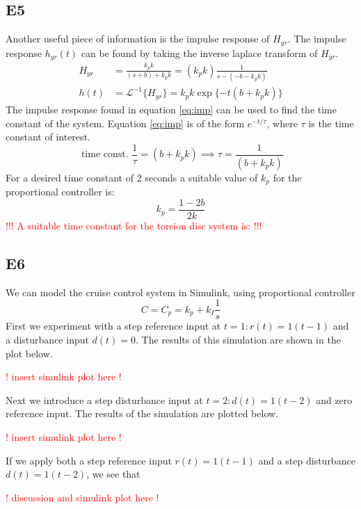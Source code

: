 \documentclass[11pt,titlepage]{article}
\begin{document}
	\subsection*{E5}
		Another useful piece of information is the impulse response of $H_{yr}$. The impulse response $h_{yr}(t)$ can be found by taking the inverse laplace transform of $H_{yr}$.
		\begin{align}
			H_{yr}&=\frac{k_pk}{(s+b)+k_pk}=(k_pk)\frac{1}{s-(-b-k_pk)} \\
			h(t)&=\mathcal{L}^{-1}\{H_{yr}\} = k_pk\exp\{{-t(b+k_pk)}\} \label{eq:imp}
		\end{align} 		
		The impulse response found in equation \ref{eq:imp} can be used to find the time constant of the system. Equation \ref{eq:imp} is of the form $e^{-t/\tau}$, where $\tau$ is the time constant of interest. 
		\begin{equation} \label{eq:tconst}
			\mbox{ time const. }\frac{1}{\tau}=(b+k_pk)\implies \tau=\frac{1}{(b+k_pk)}
		\end{equation}
		For a desired time constant of 2 seconds a suitable value of $k_p$ for the proportional controller is:
		\begin{equation} \label{eq:2stau}
			k_p=\frac{1-2b}{2k}
		\end{equation}
		\textcolor{red}{!!! A suitable time constant for the torsion disc system is: !!!}

	\subsection*{E6}
		We can model the cruise control system in Simulink, using proportional controller $$C=C_p=k_p+k_I\frac{1}{s}$$ First we experiment with a step reference input at $t=1: r(t)=1(t-1)$ and a disturbance input $d(t)=0$. The results of this simulation are shown in the plot below. 
		
		\textcolor{red}{! insert simulink plot here !}
		
		Next we introduce a step disturbance input at $t=2: d(t)=1(t-2)$ and zero reference input. The results of the simulation are plotted below.
		
		\textcolor{red}{! insert simulink plot here !}
		
		If we apply both a step reference input $r(t)=1(t-1)$ and a step disturbance $d(t)=1(t-2)$, we see that
		
		\textcolor{red}{! discussion and simulink plot here !}
		
\end{document}
